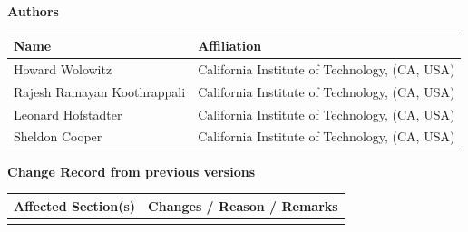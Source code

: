 \documentclass[12pt,a4paper]{article}
\begin{document}
\newpage
\noindent
{\Large \bf Authors}
\medskip

\noindent
\begin{tabular}{ |p{}|p{}| }
  \hline
      {\bf Name} & {\bf Affiliation}\\
      \hline
      Howard Wolowitz                 & California Institute of Technology, (CA, USA)\\
      Rajesh Ramayan Koothrappali     & California Institute of Technology, (CA, USA)\\
      Leonard Hofstadter              & California Institute of Technology, (CA, USA)\\
      Sheldon Cooper                  & California Institute of Technology, (CA, USA)\\
      \hline
\end{tabular}

\vspace{3cm}

\noindent
{\Large \bf Change Record from previous versions}
\medskip

\noindent
\begin{tabular}{ |p{}|p{}| }
  \hline
      {\bf Affected Section(s)} & {\bf Changes / Reason / Remarks}\\
      \hline
       & \\
      \hline
\end{tabular}


\newpage
\tableofcontents


\newpage





\newpage
\listofreq

\listofquestion


\label{LastPage}
\end{document}
